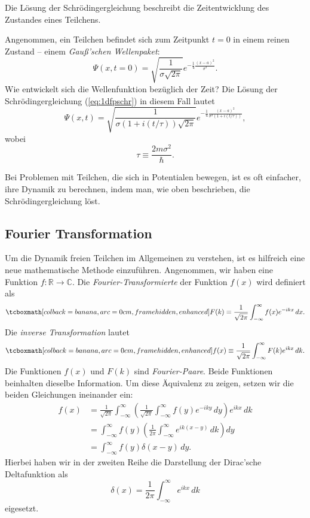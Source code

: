Die Lösung der Schrödingergleichung beschreibt die Zeitentwicklung des Zustandes eines Teilchens. 
\begin{beispiel}
	Angenommen, ein Teilchen befindet sich zum Zeitpunkt $t=0$ in einem reinen Zustand -- einem \emph{Gauß'schen Wellenpaket}:
	\begin{equation}
		\Psi(x,t=0) = \sqrt{\frac{1}{\sigma\sqrt{2\pi}}}e^{-\frac14 \frac{(x-a)^2}{\sigma^2}}.
	\end{equation}
	Wie entwickelt sich die Wellenfunktion bezüglich der Zeit? Die Lösung der Schrödingergleichung (\ref{eq:1dfpschr}) in diesem Fall lautet
	\begin{equation}
		\Psi(x,t) = \sqrt{\frac{1}{\sigma(1+i(t/\tau))\sqrt{2\pi}}}e^{-\frac14 \frac{(x-a)^2}{\sigma^2(1+i(t/\tau))}},
	\end{equation}
	wobei
	\begin{equation}
		\tau \equiv \frac{2m\sigma^2}{\hbar}.
	\end{equation}	
\end{beispiel}

Bei Problemen mit Teilchen, die sich in Potentialen bewegen, ist es oft einfacher, ihre Dynamik zu berechnen, indem man, wie oben beschrieben, die Schrödingergleichung löst.


\subsection{Fourier Transformation}
Um die Dynamik freien Teilchen im Allgemeinen zu verstehen, ist es hilfreich eine neue mathematische Methode einzuführen. Angenommen, wir haben eine Funktion $f:\mathbb{R}\rightarrow\mathbb{C}$. Die \emph{Fourier-Transformierte} der Funktion $f(x)$ wird definiert als 
\begin{equation}
	\eqbox{F(k)\equiv \frac{1}{\sqrt{2\pi}}\int_{-\infty}^\infty f(x)e^{-ikx}\, dx.}
\end{equation}
Die \emph{inverse Transformation} lautet
\begin{equation}\label{eq:invfourier}
	\eqbox{f(x)\equiv \frac{1}{\sqrt{2\pi}}\int_{-\infty}^\infty F(k)e^{ikx}\, dk.}
\end{equation}
Die Funktionen $f(x)$ und $F(k)$ sind \emph{Fourier-Paare}. Beide Funktionen beinhalten dieselbe Information. Um diese Äquivalenz zu zeigen, setzen wir die beiden Gleichungen ineinander ein:
\begin{equation}
	\begin{split}
		f(x) &= \frac{1}{\sqrt{2\pi}}\int_{-\infty}^\infty \left(\frac{1}{\sqrt{2\pi}}\int_{-\infty}^\infty f(y)e^{-iky}\, dy\right)e^{ikx}\, dk \\
		&= \int_{-\infty}^\infty f(y)\left(\frac{1}{2\pi}\int_{-\infty}^\infty e^{ik(x-y)}\, dk \right)dy \\
		&= \int_{-\infty}^\infty f(y)\delta(x-y)\,dy.
	\end{split}
\end{equation}
Hierbei haben wir in der zweiten Reihe die Darstellung der Dirac'sche Deltafunktion als 
\begin{equation}
	\delta(x) = \frac{1}{2\pi}\int_{-\infty}^\infty e^{ikx}\, dk
\end{equation}
eigesetzt.

